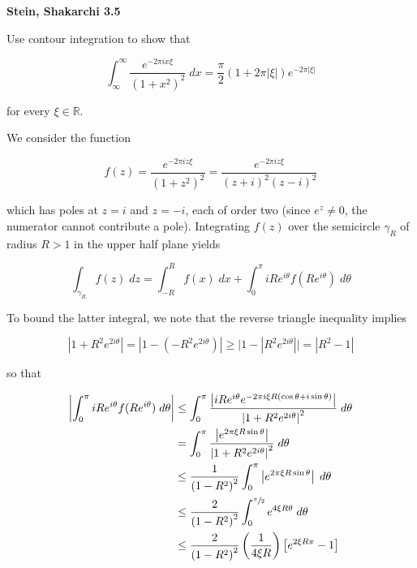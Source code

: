 \textbf{Stein, Shakarchi 3.5}

Use contour integration to show that

$$
\int_{\infty}^{\infty} { \frac{e^{-2 \pi i x \xi}}{\left( 1 + x^2 \right)^2} \; dx } = \frac{\pi}{2} (1 + 2 \pi |\xi|) e^{-2 \pi |\xi|}
$$

for every $\xi \in \mathbb{R}$.

\begin{solution}
  We consider the function 

  $$
  f(z) = \frac{e^{-2 \pi i z \xi}}{\left(1 + z^2\right)^2} = \frac{e^{-2 \pi i z \xi}}{(z + i)^2 (z - i)^2}
  $$

  which has poles at $z = i$ and $z = -i$, each of order two (since $e^z \neq 0$, the numerator cannot contribute a 
  pole). Integrating $f(z)$ over the semicircle $\gamma_R$ of radius $R > 1$ in the upper half plane yields

  $$
  \int_{\gamma_R} { f(z) \; dz } = \int_{-R}^{R} { f(x) \; dx } 
                                 + \int_0^{\pi} { i R e^{i \theta} f(R e^{i \theta}) \; d\theta }
  $$

  To bound the latter integral, we note that the reverse triangle inequality implies

  $$
  \left|1 + R^2 e^{2 i \theta}\right| = \left|1 - \left(-R^2 e^{2 i \theta}\right)\right| 
                                      \ge \Big| 1 - \left| R^2 e^{2 i \theta} \right| \Big| 
                                      = \left|R^2 - 1\right|
  $$

  so that

  \begin{align*}
    \left| \int_0^{\pi} { i R e^{i \theta} f(R e^{i \theta}) \; d\theta } \right|
      &\le \int_0^{\pi} { \frac{\left| i R e^{i \theta} e^{-2 \pi i \xi R (\cos{\theta} + i \sin{\theta})} \right|}{\left| 1 + R^2 e^{2 i \theta} \right|^2} \; d\theta } \\
      &= \int_0^{\pi} { \frac{\left| e^{2 \pi \xi R \sin{\theta}} \right|}{\left| 1 + R^2 e^{2 i \theta} \right|^2} \; d\theta } \\
      &\le \frac{1}{\left(1 - R^2\right)^2} \int_0^{\pi} { \left| e^{2 \pi \xi R \sin{\theta}} \right| \; d\theta } \\
      &\le \frac{2}{\left(1 - R^2\right)^2} \int_0^{\sfrac{\pi}{2}} { e^{4 \xi R \theta} \; d\theta } \\
      &\le \frac{2}{\left(1 - R^2\right)^2} \left(\frac{1}{4 \xi R} \right) \left[ e^{2 \xi R \pi} - 1 \right] 
  \end{align*}


\end{solution}
